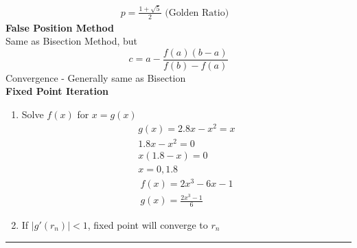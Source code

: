 \documentclass[10pt]{article}
\begin{document}
\begin{multicols}{2}
\begin{minipage}{\columnwidth}
\begin{flushright}
\begin{equation*}
\begin{aligned}
                    p = \frac{1 + \sqrt{5}}{2} \text{ (Golden Ratio)} &
                \end{aligned}
            \end{equation*}
            \textbf{False Position Method} \\
            Same as Bisection Method, but
            \begin{equation*}
                c = a - \frac{f(a) (b-a)}{f(b) - f(a)}
            \end{equation*}
            Convergence - Generally same as Bisection \\
            \textbf{Fixed Point Iteration}
            \begin{enumerate}
                \item Solve \(f(x)\) for \(x = g(x)\) \\
                      \begin{align*}
                          g(x) = 2.8x - x^2 = x \\
                          1.8x -x^2 = 0         \\
                          x(1.8 - x) = 0        \\
                          x = 0, 1.8
                      \end{align*}
                      \begin{align*}
                          f(x) = 2x^3 - 6x - 1 \\
                          g(x) = \frac{2x^3-1}{6}
                      \end{align*}
                \item If \(|g'(r_n)| < 1\), fixed point will converge to \(r_n\)
            \end{enumerate}
        \end{flushright}
    \end{minipage}
\end{multicols}

\begin{center}
    \rule{4in}{1pt}
\end{center}

\vspace{-1.5em}
\end{document}
